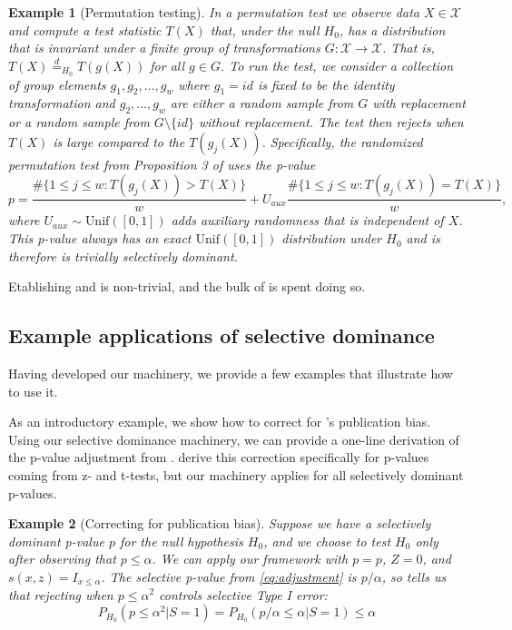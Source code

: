 \documentclass{article}
\newtheorem{example}{Example}
\begin{document}
\begin{example}[Permutation testing]
In a permutation test we observe data $X \in \mathcal{X}$ and compute a test statistic $T(X)$ that, under the null $H_0$, has a distribution that is invariant under a finite group of transformations $G : \mathcal{X} \rightarrow \mathcal{X}$. That is, $T(X) \overset{d}{=}_{H_0} T(g(X))$ for all $ g \in G$. To run the test, we consider a collection of group elements $g_1, g_2, \dots, g_w$ where $g_1 = id$ is fixed to be the identity transformation and $g_2, \dots, g_w$ are either a random sample from $G$ with replacement or a random sample from $G \setminus \{id \}$ without replacement. The test then rejects when $T(X)$ is large compared to the $T(g_j(X))$. Specifically, the randomized permutation test from Proposition 3 of \cite{Hemerik} uses the p-value
\begin{equation*}
    p = \frac{\#\{1 \leq j \leq w : T(g_j(X)) > T(X) \}}{w} + U_{aux} \frac{\#\{1 \leq j \leq w : T(g_j(X)) = T(X) \}}{w},
\end{equation*}
where $U_{aux} \sim \text{Unif}([0, 1])$ adds auxiliary randomness that is independent of $X$. This p-value always has an exact $\text{Unif}([0, 1])$ distribution under $H_0$ and is therefore is trivially selectively dominant. 
\end{example}

Etablishing  and  is non-trivial, and the bulk of  is spent doing so. 

\subsection{Example applications of selective dominance}

Having developed our machinery, we provide a few examples that illustrate how to use it.

As an introductory example, we show how to correct for 's publication bias. Using our selective dominance machinery, we can provide a one-line derivation of the p-value adjustment from \cite{Hung2020}. \cite{Hung2020} derive this correction specifically for p-values coming from z- and t-tests, but our machinery applies for all selectively dominant p-values. 

\begin{example}[Correcting for publication bias]
\label{exm:correction}
Suppose we have a selectively dominant p-value $p$ for the null hypothesis $H_0$, and we choose to test $H_0$ only after observing that $p \leq \alpha$. We can apply our framework with $p=p$, $Z=0$, and $s(x, z) = I_{x \leq \alpha}$. The selective p-value from \eqref{eq:adjustment} is $p/\alpha$, so  tells us that rejecting when $p \leq \alpha^2$ controls selective Type I error:
\begin{equation*}
    P_{H_0}(p \leq \alpha^2 | S= 1) =  P_{H_0}(p/\alpha \leq \alpha | S= 1) \leq \alpha  
\end{equation*}
\end{example}
\end{document}
